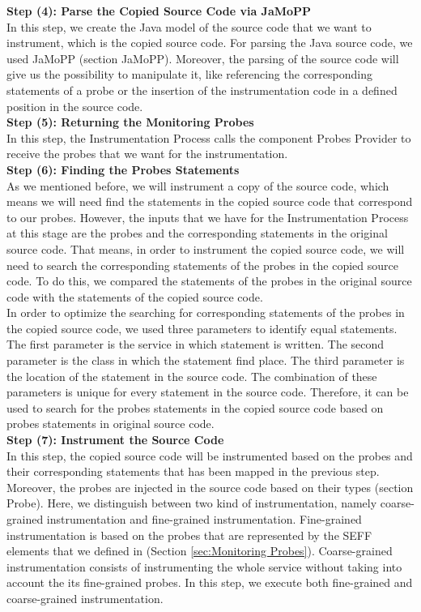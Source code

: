 \textbf{Step (4): Parse the Copied Source Code via JaMoPP}\\
In this step, we create the Java model of the source code that we want to instrument, which is the copied source code. For parsing the Java source code, we used JaMoPP (section JaMoPP). Moreover, the parsing of the source code will give us the possibility to manipulate it, like referencing the corresponding statements of a probe or the insertion of the instrumentation code in a defined position in the source code.\\

\textbf{Step (5): Returning the Monitoring Probes}\\
In this step, the Instrumentation Process calls the component Probes Provider to receive the probes that we want for the instrumentation.\\

\textbf{Step (6): Finding the Probes Statements}\\
As we mentioned before, we will instrument a copy of the source code, which means we will need find the statements in the copied source code that correspond to our probes. However, the inputs that we have for the Instrumentation Process at this stage are the probes and the corresponding statements in the original source code. That means, in order to instrument the copied source code, we will need to search the corresponding statements of the probes in the copied source code. To do this, we compared the statements of the probes in the original source code with the statements of the copied source code. \\

In order to optimize the searching for corresponding statements of the probes in the copied source code, we used three parameters to identify equal statements. The first parameter is the service in which statement is written. The second parameter is the class in which the statement find place. The third parameter is the location of the statement in the source code. The combination of these parameters is unique for every statement in the source code. Therefore, it can be used to search for the probes statements in the copied source code based on probes statements in original source code. \\

\textbf{Step (7): Instrument the Source Code}\\
In this step, the copied source code will be instrumented based on the probes and their corresponding statements that has been mapped in the previous step. Moreover, the probes are injected in the source code based on their types (section Probe).  Here, we distinguish between two kind of instrumentation, namely coarse-grained instrumentation and fine-grained instrumentation. Fine-grained instrumentation is based on the probes that are represented by the SEFF elements that we defined in (Section \ref{sec:Monitoring Probes}). Coarse-grained instrumentation consists of instrumenting the whole service without taking into account the its fine-grained probes. In this step, we execute both fine-grained and coarse-grained instrumentation. 

